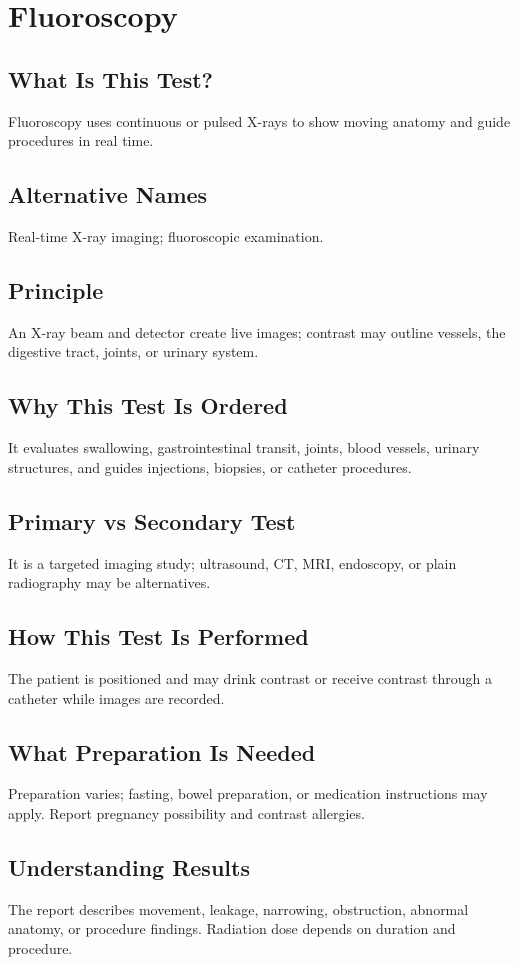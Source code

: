 \chapter{Fluoroscopy}
\section*{What Is This Test?} Fluoroscopy uses continuous or pulsed X-rays to show moving anatomy and guide procedures in real time.
\section*{Alternative Names} Real-time X-ray imaging; fluoroscopic examination.
\section*{Principle} An X-ray beam and detector create live images; contrast may outline vessels, the digestive tract, joints, or urinary system.
\section*{Why This Test Is Ordered} It evaluates swallowing, gastrointestinal transit, joints, blood vessels, urinary structures, and guides injections, biopsies, or catheter procedures.
\section*{Primary vs Secondary Test} It is a targeted imaging study; ultrasound, CT, MRI, endoscopy, or plain radiography may be alternatives.
\section*{How This Test Is Performed} The patient is positioned and may drink contrast or receive contrast through a catheter while images are recorded.
\section*{What Preparation Is Needed} Preparation varies; fasting, bowel preparation, or medication instructions may apply. Report pregnancy possibility and contrast allergies.
\section*{Understanding Results} The report describes movement, leakage, narrowing, obstruction, abnormal anatomy, or procedure findings. Radiation dose depends on duration and procedure.
